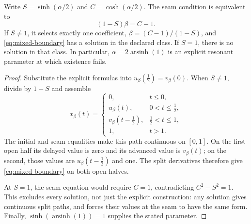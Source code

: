 \begin{theorem}
\label{thm:mixed-existence}
Write $S=\sinh(\alpha/2)$ and $C=\cosh(\alpha/2)$.
The seam condition is equivalent to
\[
 (1-S)\beta=C-1.
\]
If $S\ne1$, it selects exactly one coefficient,
$\beta=(C-1)/(1-S)$, and \eqref{eq:mixed-boundary} has a solution in
the declared class. If $S=1$, there is no solution in that class.
In particular, $\alpha=2\operatorname{arsinh}(1)$ is an explicit
resonant parameter at which existence fails.
\end{theorem}
\begin{proof}
Substitute the explicit formulas into $u_\beta(\tfrac12)=v_\beta(0)$.
When $S\ne1$, divide by $1-S$ and assemble
\[
 x_\beta(t)=
 \begin{cases}
 0,&t\le0,\\
 u_\beta(t),&0<t\le\tfrac12,\\
 v_\beta(t-\tfrac12),&\tfrac12<t\le1,\\
 1,&t>1.
 \end{cases}
\]
The initial and seam equalities make this path continuous on $[0,1]$.
On the first open half its delayed value is zero and its advanced
value is $v_\beta(t)$; on the second, those values are
$u_\beta(t-\tfrac12)$ and one. The split derivatives therefore give
\eqref{eq:mixed-boundary} on both open halves.

At $S=1$, the seam equation would require $C=1$, contradicting
$C^2-S^2=1$. This excludes every solution, not just the explicit
construction: any solution gives continuous split paths, and
 forces their values at the seam to have the
same form. Finally, $\sinh(\operatorname{arsinh}(1))=1$ supplies the
stated parameter.
\end{proof}

